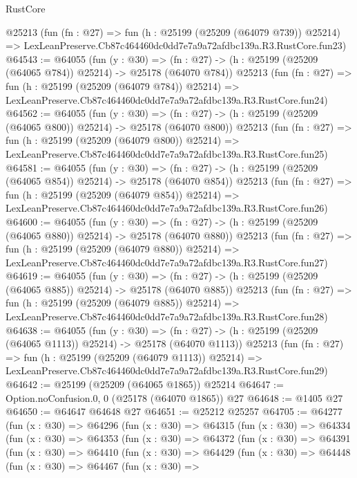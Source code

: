 \begin{lexlean}{RustCore}
\begin{coremodule}
    @25213
    (fun (fn : @27) =>
    fun (h : @25199 (@25209 (@64079 @739)) @25214) =>
    LexLeanPreserve.Cb87c464460dc0dd7e7a9a72afdbc139a.R3.RustCore.fun23)
@64543 := @64055
    (fun (y : @30) =>
    (fn : @27) -> (h : @25199 (@25209 (@64065 @784)) @25214) -> @25178 (@64070 @784))
    @25213
    (fun (fn : @27) =>
    fun (h : @25199 (@25209 (@64079 @784)) @25214) =>
    LexLeanPreserve.Cb87c464460dc0dd7e7a9a72afdbc139a.R3.RustCore.fun24)
@64562 := @64055
    (fun (y : @30) =>
    (fn : @27) -> (h : @25199 (@25209 (@64065 @800)) @25214) -> @25178 (@64070 @800))
    @25213
    (fun (fn : @27) =>
    fun (h : @25199 (@25209 (@64079 @800)) @25214) =>
    LexLeanPreserve.Cb87c464460dc0dd7e7a9a72afdbc139a.R3.RustCore.fun25)
@64581 := @64055
    (fun (y : @30) =>
    (fn : @27) -> (h : @25199 (@25209 (@64065 @854)) @25214) -> @25178 (@64070 @854))
    @25213
    (fun (fn : @27) =>
    fun (h : @25199 (@25209 (@64079 @854)) @25214) =>
    LexLeanPreserve.Cb87c464460dc0dd7e7a9a72afdbc139a.R3.RustCore.fun26)
@64600 := @64055
    (fun (y : @30) =>
    (fn : @27) -> (h : @25199 (@25209 (@64065 @880)) @25214) -> @25178 (@64070 @880))
    @25213
    (fun (fn : @27) =>
    fun (h : @25199 (@25209 (@64079 @880)) @25214) =>
    LexLeanPreserve.Cb87c464460dc0dd7e7a9a72afdbc139a.R3.RustCore.fun27)
@64619 := @64055
    (fun (y : @30) =>
    (fn : @27) -> (h : @25199 (@25209 (@64065 @885)) @25214) -> @25178 (@64070 @885))
    @25213
    (fun (fn : @27) =>
    fun (h : @25199 (@25209 (@64079 @885)) @25214) =>
    LexLeanPreserve.Cb87c464460dc0dd7e7a9a72afdbc139a.R3.RustCore.fun28)
@64638 := @64055
    (fun (y : @30) =>
    (fn : @27) -> (h : @25199 (@25209 (@64065 @1113)) @25214) -> @25178 (@64070 @1113))
    @25213
    (fun (fn : @27) =>
    fun (h : @25199 (@25209 (@64079 @1113)) @25214) =>
    LexLeanPreserve.Cb87c464460dc0dd7e7a9a72afdbc139a.R3.RustCore.fun29)
@64642 := @25199 (@25209 (@64065 @1865)) @25214
@64647 := Option.noConfusion.{0, 0} (@25178 (@64070 @1865)) @27
@64648 := @1405 @27
@64650 := @64647 @64648 @27
@64651 := @25212 @25257
@64705 := @64277
    (fun (x : @30) =>
    @64296
      (fun (x : @30) =>
      @64315
        (fun (x : @30) =>
        @64334
          (fun (x : @30) =>
          @64353
            (fun (x : @30) =>
            @64372
              (fun (x : @30) =>
              @64391
                (fun (x : @30) =>
                @64410
                  (fun (x : @30) =>
                  @64429
                    (fun (x : @30) =>
                    @64448
                      (fun (x : @30) =>
                      @64467
                        (fun (x : @30) =>

\end{coremodule}
\end{lexlean}
